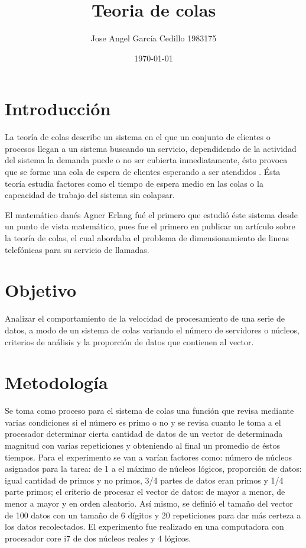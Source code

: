 \documentclass{article}
\author{Jose Angel García Cedillo 1983175}
\title{Teoria de colas}
\date{\today}
\begin{document}
\maketitle


\section{Introducción}

La teoría de colas describe un sistema en el que un conjunto de clientes o procesos llegan a un sistema buscando un servicio, dependidendo de la actividad del sistema la demanda puede o no ser cubierta inmediatamente, ésto provoca que se forme una cola de espera de clientes esperando a ser atendidos \cite{ref1}. Ésta teoría estudia factores como el tiempo de espera medio en las colas o la capcacidad de trabajo del sistema sin colapsar. 

El matemático danés Agner Erlang fué el primero que estudió éste sistema desde un punto de vista matemático, pues fue el primero en publicar un artículo sobre la teoría de colas, el cual abordaba el problema de dimensionamiento de lineas telefónicas para su servicio de llamadas. \cite{url1}
 
\section{Objetivo}
Analizar el comportamiento de la velocidad de procesamiento de una serie de datos, a modo de un sistema de colas variando el número de servidores o núcleos, criterios de análisis y la proporción de datos que contienen al vector.

\section{Metodología}
Se toma como proceso para el sistema de colas una función que revisa mediante varias condiciones si el número es primo o no \cite{elisawebp3} y se revisa cuanto le toma a el procesador determinar cierta cantidad de datos de un vector de determinada magnitud con varias repeticiones y obteniendo al final un promedio de éstos tiempos.
Para el experimento se van a varían factores como: número de núcleos asignados para la tarea: de 1 a el máximo de núcleos lógicos, proporción de datos: igual cantidad de primos y no primos, 3/4 partes de datos eran primos y 1/4 parte primos; el criterio de procesar el vector de datos: de mayor a menor, de menor a mayor y en orden aleatorio.
Así mismo, se definió el tamaño del vector de 100 datos con un tamaño de 6 dígitos y 20 repeticiones para dar más certeza a los datos recolectados.
El experimento fue realizado en una computadora con procesador core i7 de dos núcleos reales y 4 lógicos.
\end{document}

